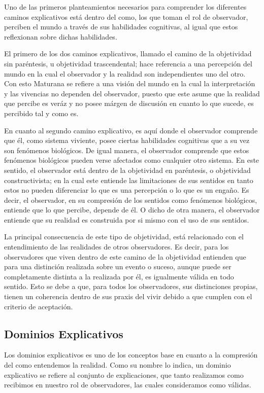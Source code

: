 \documentclass[10pt]{article}
\begin{document}
        Uno de las primeros planteamientos necesarios para comprender los diferentes caminos explicativos está dentro del como, los que toman el rol de observador, perciben el mundo a través de sus habilidades cognitivas, al igual que estos reflexionan sobre dichas habilidades. 

        El primero de los dos caminos explicativos, llamado el camino de la objetividad sin paréntesis, u objetividad trascendental; hace referencia a una percepción del mundo en la cual el observador y la realidad son independientes uno del otro. Con esto Maturana se refiere a una visión del mundo en la cual la interpretación y las vivencias no dependen del observador, puesto que este asume que la realidad que percibe es veráz y no posee márgen de discusión en cuanto lo que sucede, es percibido tal y como es.

        En cuanto al segundo camino explicativo, es aquí donde el observador comprende que él, como sistema viviente, posee ciertas habilidades cognitivas que a su vez son fenómenos biológicos. De igual manera, el observador comprende que estos fenómenos biológicos pueden verse afectados como cualquier otro sistema. En este sentido, el observador está dentro de la objetividad en paréntesis, o objetividad constructivista; en la cual este entiende las limitaciones de sus sentidos en tanto estos no pueden diferenciar lo que es una percepción o lo que es un engaño. Es decir, el observador, en su compresión de los sentidos como fenómenos biológicos, entiende que lo que percibe, depende de él. O dicho de otra manera, el observador entiende que su realidad es construida por si mismo con el uso de sus sentidos. 

        La principal consecuencia de este tipo de objetividad, está relacionado con el entendimiento de las realidades de otros observadores. Es decir, para los observadores que viven dentro de este camino de la objetividad entienden que para una distinción realizada sobre un evento o suceso, aunque puede ser completamente distinta a la realizada por él, es igualmente válida en todo sentido. Esto se debe a que, para todos los observadores, sus distinciones propias, tienen un coherencia dentro de sus praxis del vivir debido a que cumplen con el criterio de aceptación.

        \subsection{Dominios Explicativos}

        Los dominios explicativos es uno de los conceptos base en cuanto a la compresión del como entendemos la realidad. Como su nombre lo indica, un dominio explicativo se refiere al conjunto de explicaciones, que tanto realizamos como recibimos en nuestro rol de observadores, las cuales consideramos como válidas. 
        
\end{document}
